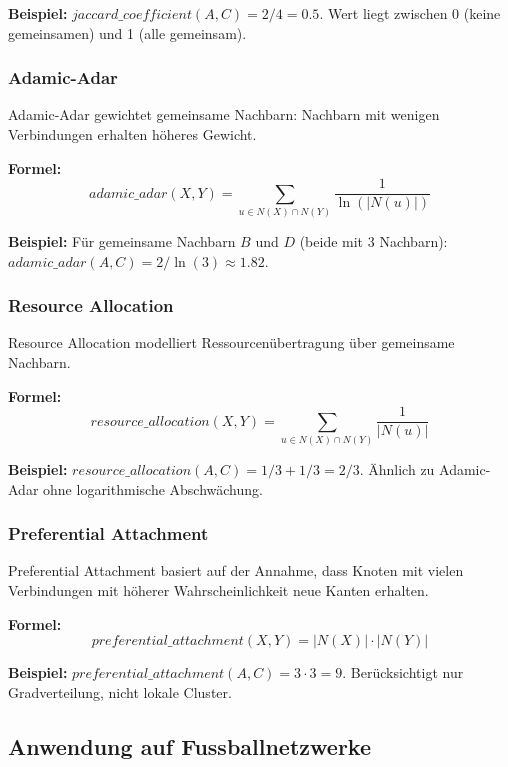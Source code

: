 \textbf{Beispiel:} $jaccard\_coefficient(A, C) = 2/4 = 0.5$. Wert liegt zwischen 0 (keine gemeinsamen) und 1 (alle gemeinsam).

\subsubsection{Adamic-Adar}

Adamic-Adar gewichtet gemeinsame Nachbarn: Nachbarn mit wenigen Verbindungen erhalten höheres Gewicht.

\textbf{Formel:}
\begin{equation}
adamic\_adar(X, Y) = \sum_{u \in N(X) \cap N(Y)} \frac{1}{\ln(|N(u)|)}
\label{eq:aa}
\end{equation}

\textbf{Beispiel:} Für gemeinsame Nachbarn $B$ und $D$ (beide mit 3 Nachbarn): $adamic\_adar(A, C) = 2/\ln(3) \approx 1.82$.

\subsubsection{Resource Allocation}

Resource Allocation modelliert Ressourcenübertragung über gemeinsame Nachbarn.

\textbf{Formel:}
\begin{equation}
resource\_allocation(X, Y) = \sum_{u \in N(X) \cap N(Y)} \frac{1}{|N(u)|}
\label{eq:ra}
\end{equation}

\textbf{Beispiel:} $resource\_allocation(A, C) = 1/3 + 1/3 = 2/3$. Ähnlich zu Adamic-Adar ohne logarithmische Abschwächung.

\subsubsection{Preferential Attachment}

Preferential Attachment basiert auf der Annahme, dass Knoten mit vielen Verbindungen mit höherer Wahrscheinlichkeit neue Kanten erhalten.

\textbf{Formel:}
\begin{equation}
preferential\_attachment(X, Y) = |N(X)| \cdot |N(Y)|
\label{eq:pa}
\end{equation}

\textbf{Beispiel:} $preferential\_attachment(A, C) = 3 \cdot 3 = 9$. Berücksichtigt nur Gradverteilung, nicht lokale Cluster.

\subsection{Anwendung auf Fussballnetzwerke}

